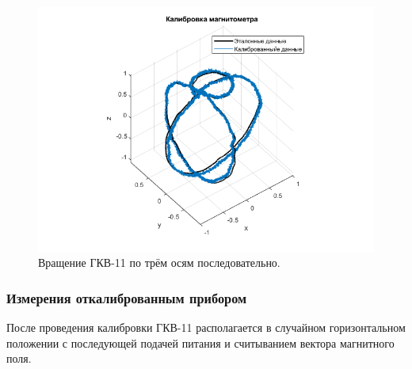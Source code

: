 \documentclass[a4paper,12pt]{article}
\begin{document}
\begin{figure}[htb] %
\centering
\includegraphics[width=1\textwidth]{PICS/one_of_experiments.png} %
\caption{\label{fig:one_of_experiments} Вращение ГКВ-11 по трём осям последовательно.} %
\end{figure}

\subsubsection{Измерения откалиброванным прибором}
После проведения калибровки ГКВ-11 располагается в случайном горизонтальном положении с последующей подачей питания и считыванием вектора магнитного поля.


\end{document}

